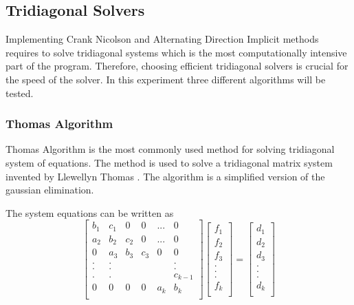 \documentclass[12pt, oneside]{book}
\theoremstyle{plain}
\theoremstyle{definition}
\begin{document}
\subsection{Tridiagonal Solvers}
Implementing Crank Nicolson and Alternating Direction Implicit methods requires to solve tridiagonal systems which is the most computationally intensive part of the program.  Therefore, choosing efficient tridiagonal solvers is crucial for the speed of the solver. In this experiment three different algorithms will be tested.

\subsubsection{Thomas Algorithm}
Thomas Algorithm is the most commonly used method for solving tridiagonal system of equations. The method is used to solve a tridiagonal matrix system invented by Llewellyn Thomas \cite{thomas}. The algorithm is a simplified version of the gaussian elimination.

The system equations can be written as
$$
\begin{bmatrix}  
b_1 & c_1 & 0 & 0 & ... & 0 \\ 
a_2 & b_2 & c_2 & 0 & ... & 0 \\ 
0 & a_3 & b_3 & c_3 & 0 & 0 \\ 
. & . &  &  &  & . \\ 
. & . &  &  &  & . \\ 
. & . &  &  &  & c_{k-1} \\ 
0 & 0 & 0 & 0 & a_k & b_k \\ 
\end{bmatrix} \begin{bmatrix}  
f_1 \\ 
f_2 \\ 
f_3 \\ 
.\\ 
.\\ 
.\\ 
f_k \\ 
\end{bmatrix} = \begin{bmatrix} 
d_1 \\ 
d_2 \\ 
d_3 \\ 
.\\ 
.\\ 
.\\ 
d_k \\ 
\end{bmatrix}
$$
\end{document}
